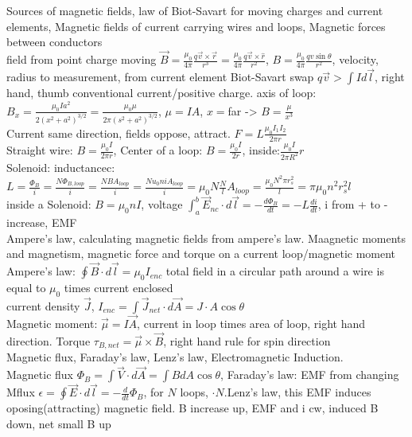 \documentclass{article}
\begin{document}
\begin{large}
\begin{tabular}{ c c c c c }
\end{tabular}
\newpage
\indent Sources of magnetic fields, law of Biot-Savart for moving charges and current elements, Magnetic fields of current carrying wires and loops, Magnetic forces between conductors
\\field from point charge moving $\vec B=\frac{\mu_0}{4\pi} \frac{q\vec v\times\vec r}{r^3}=\frac{\mu_0}{4\pi} \frac{q\vec v\times\hat r}{r^2}$, $B=\frac{\mu_0}{4\pi}\frac{qv\sin\theta}{r^2}$, velocity, radius to measurement, from current element Biot-Savart swap $q\vec v>\int Id\vec l$, right hand, thumb conventional current/positive charge. axis of loop: $B_x=\frac{\mu_0Ia^2}{2(x^2+a^2)^{3/2}}=\frac{\mu_0\mu}{2\pi(s^2+a^2)^{3/2}}$, $\mu=IA$, $x=$far -> $B=\frac{\mu}{x^3}$
\\Current same direction, fields oppose, attract. $F=L\frac{\mu_0I_1I_2}{2\pi r}$
\\Straight wire: $B=\frac{\mu_0I}{2\pi r}$, Center of a loop: $B=\frac{\mu_0I}{2r}$, inside:$\frac{\mu_0I}{2\pi R^2}r$
\\Solenoid: inductancec: $L=\frac{\Phi_B}{i}=\frac{N\Phi_{B,loop}}{i}=\frac{NBA_{loop}}{i}=\frac{Nu_0niA_{loop}}{i}=\mu_0N\frac{N}{l}A_{loop}=\frac{\mu_0N^2\pi r_s^2}{l}=\pi\mu_0n^2r_s^2l$
\\inside a Solenoid: $B=\mu_0nI$, voltage $\int_a^b\vec E_{nc}\cdot d\vec l=-\frac{d\Phi_B}{dt}=-L\frac{di}{dt}$, i from + to - increase, EMF 
\\\indent Ampere's law, calculating magnetic fields from ampere's law. Maagnetic moments and magnetism, magnetic force and torque on a current loop/magnetic moment
\\Ampere's law: $\oint\vec B\cdot d\vec l=\mu_0I_{enc}$ total field in a circular path around a wire is equal to $\mu_0$ times current enclosed
\\current density $\vec J$, $I_{enc}=\int\vec J_{net}\cdot d\vec A=J\cdot A \cos\theta$
\\Magnetic moment: $\vec \mu=I\vec A$, current in loop times area of loop, right hand direction. Torque $\tau_{B,net}=\vec\mu\times\vec B$, right hand rule for spin direction
\\\indent Magnetic flux, Faraday's law, Lenz's law, Electromagnetic Induction.
\\Magnetic flux $\Phi_B=\int\vec V\cdot d\vec A=\int B dA\cos\theta$, Faraday's law: EMF from changing Mflux $\epsilon=\oint\vec E\cdot d\vec l=-\frac{d}{dt}\Phi_B$, for $N$ loops, $\cdot N$.\qquad Lenz's law, this EMF induces oposing(attracting) magnetic field. B increase up, EMF and i cw, induced B down, net small B up 

\end{large}
\end{document}
